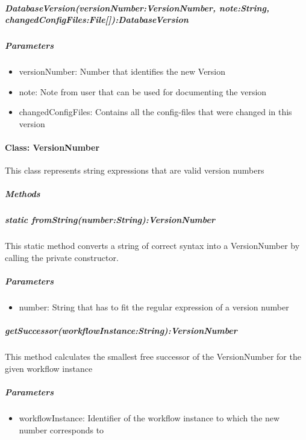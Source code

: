 \subparagraph{DatabaseVersion(versionNumber:VersionNumber, note:String, changedConfigFiles:File[]):DatabaseVersion}

\subparagraph{Parameters}
\begin{itemize}
	\item{versionNumber:}
	Number that identifies the new Version
	\item{note:}
	Note from user that can be used for documenting the version
	\item{changedConfigFiles:}
	Contains all the config-files that were changed in this version
\end{itemize}


\paragraph{Class: VersionNumber}
This class represents string expressions that are valid version numbers
\subparagraph{Methods}

\subparagraph{static fromString(number:String):VersionNumber}
This static method converts a string of correct syntax into a VersionNumber by calling the private constructor.

\subparagraph{Parameters}
\begin{itemize}
	\item{number:}
	String that has to fit the regular expression of a version number
\end{itemize}

\subparagraph{getSuccessor(workflowInstance:String):VersionNumber}
This method calculates the smallest free successor of the VersionNumber for the given workflow instance

\subparagraph{Parameters}
\begin{itemize}
	\item{workflowInstance:}
	Identifier of the workflow instance to which the new number corresponds to
\end{itemize}

